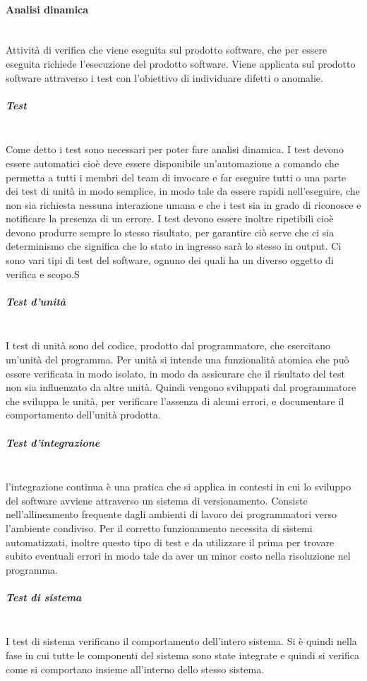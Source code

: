 \paragraph{Analisi dinamica} \mbox{}\\
Attività di verifica che viene eseguita sul prodotto software, che per essere eseguita richiede l’esecuzione del prodotto software. Viene applicata sul prodotto software attraverso i test con l’obiettivo di individuare difetti o anomalie.

\setlength{\parindent}{-0.1em}
\subparagraph{Test} \mbox{}\\
Come detto i test sono necessari per poter fare analisi dinamica.  
I test devono essere automatici cioè deve essere disponibile un’automazione a comando che permetta a tutti i membri del team di invocare e far eseguire tutti o una parte dei test di unità in modo semplice, in modo tale da essere rapidi nell’eseguire, che non sia richiesta nessuna interazione umana e che i test sia in grado di riconosce e notificare la presenza di un errore. I test devono essere inoltre ripetibili cioè devono produrre sempre lo stesso risultato, per garantire ciò serve che ci sia determinismo che significa che lo stato in ingresso sarà lo stesso in output.
Ci sono vari tipi di test del software, ognuno dei quali ha un diverso oggetto di verifica e scopo.S


\subparagraph{Test d’unità} \mbox{}\\
I test di unità sono del codice, prodotto dal programmatore, che esercitano un’unità del programma. Per unità si intende una funzionalità atomica che può essere verificata in modo isolato, in modo da assicurare che il risultato del test non sia influenzato da altre unità. Quindi vengono sviluppati dal programmatore che sviluppa le unità, per verificare l’assenza di alcuni errori, e documentare il comportamento dell’unità prodotta.

\subparagraph{Test d’integrazione} \mbox{}\\
l'integrazione continua è una pratica che si applica in contesti in cui lo sviluppo del software avviene attraverso un sistema di versionamento. Consiste nell'allineamento frequente dagli ambienti di lavoro dei programmatori verso l'ambiente condiviso. Per il corretto funzionamento necessita di sistemi automatizzati, inoltre questo tipo di test e da utilizzare il prima per trovare subito eventuali errori in modo tale da aver un minor costo nella risoluzione nel programma.

\subparagraph{Test di sistema} \mbox{}\\
I test di sistema verificano il comportamento dell’intero sistema. Si è quindi nella fase in cui tutte le componenti del sistema sono state integrate e quindi si verifica come si comportano insieme all’interno dello stesso sistema. 

